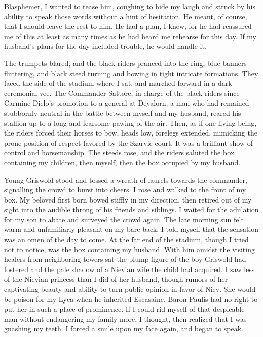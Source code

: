 \documentclass{article}
\begin{document}
Blasphemer, I wanted to tease him, coughing to hide my laugh and struck by his ability to speak those words without a hint of hesitation. He meant, of course, that I should leave the rest to him. He had a plan, I knew, for he had reassured me of this at least as many times as he had heard me rehearse for this day. If my husband's plans for the day included trouble, he would handle it.

The trumpets blared, and the black riders pranced into the ring, blue banners fluttering, and black steed turning and bowing in tight intricate formations. They faced the side of the stadium where I sat, and marched forward in a dark ceremonial vee. The Commander Sattore, in charge of the black riders since Carmine Dielo's promotion to a general at Deyalorn, a man who had remained stubbornly neutral in the battle between myself and my husband, reared his stallion up to a long and fearsome pawing of the air. Then, as if one living being, the riders forced their horses to bow, heads low, forelegs extended, mimicking the prone position of respect favored by the Szarvic court. It was a brilliant show of control and horsemanship. The steeds rose, and the riders saluted the box containing my children, then myself, then the box occupied by my husband.

Young Griswold stood and tossed a wreath of laurels towards the commander, signalling the crowd to burst into cheers. I rose and walked to the front of my box. My beloved first born bowed stiffly in my direction, then retired out of my sight into the audible throng of his friends and siblings. I waited for the adulation for my son to abate and surveyed the crowd again. The late morning sun felt warm and unfamiliarly pleasant on my bare back. I told myself that the sensation was an omen of the day to come. At the far end of the stadium, though I tried not to notice, was the box containing my husband. With him amidst the visiting healers from neighboring towers sat the plump figure of the boy Griswold had fostered and the pale shadow of a Nievian wife the child had acquired. I saw less of the Nievian princess than I did of her husband, though rumors of her captivating beauty and ability to turn public opinion in favor of Niev. She would be poison for my Lyca when he inherited Escasaine. Baron Paulis had no right to put her in such a place of prominence. If I could rid myself of that despicable man without endangering my family more, I thought, then realized that I was gnashing my teeth. I forced a smile upon my face again, and began to speak.
\end{document}
